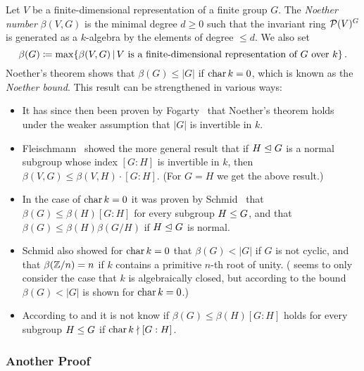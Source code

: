 \begin{remark}
  \label{remark: Noether bound}
  Let $V$ be a finite-dimensional representation of a finite group $G$.
  The \emph{Noether number} $\beta(V,G)$ is the minimal degree $d \geq 0$ such that the invariant ring $\mathcal{P}(V)^G$ is generated as a $k$-algebra by the elements of degree $\leq d$.
  We also set
  \[
              \beta(G)
    \defined  \max  \{
                      \beta(V,G)
                    \suchthat
                      \text{$V$ is a finite-dimensional representation of $G$ over $k$}
                    \} \,.
  \]
  Noether’s theorem shows that $\beta(G) \leq |G|$ if $\operatorname{char} k = 0$, which is known as the \emph{Noether bound}.
  This result can be strengthened in various ways:
  \begin{itemize}
    \item
      It has since then been proven by Fogarty~\cite{Fogarty2001} that Noether’s theorem holds under the weaker assumption that $|G|$ is invertible in $k$.
    \item
      Fleischmann~\cite{Fleischmann2000} showed the more general result that if $H \trianglelefteq G$ is a normal subgroup whose index $[G : H]$ is invertible in $k$, then $\beta(V,G) \leq \beta(V,H) \cdot [G : H]$.
      (For $G = H$ we get the above result.)
    \item
      In the case of $\operatorname{char}{k} = 0$ it was proven by Schmid~\cite{Schmid1991} that $\beta(G) \leq \beta(H)[G : H]$ for every subgroup $H \leq G$, and that $\beta(G) \leq \beta(H)\beta(G/H)$ if $H \trianglelefteq G$ is normal.
    \item
      Schmid also showed for $\operatorname{char} k = 0$ that $\beta(G) < |G|$ if $G$ is not cyclic, and that $\beta(\mathbb{Z}/n) = n$ if $k$ contains a primitive $n$-th root of unity.
      (\cite{Schmid1991} seems to only consider the case that $k$ is algebraically closed, but according to \cite[Theorem~3.7]{Wehlau2006} the bound $\beta(G) < |G|$ is shown for $\operatorname{char} k = 0$.)
    \item
      According to \cite[Remark 3.6]{Wehlau2006} and \cite[Remark~3.2.5]{Derksen2015} it is not know if $\beta(G) \leq \beta(H)[G : H]$ holds for every subgroup $H \leq G$ if $\operatorname{char} k \nmid [G : H]$. 
  \end{itemize}
\end{remark}



\subsubsection*{Another Proof}


